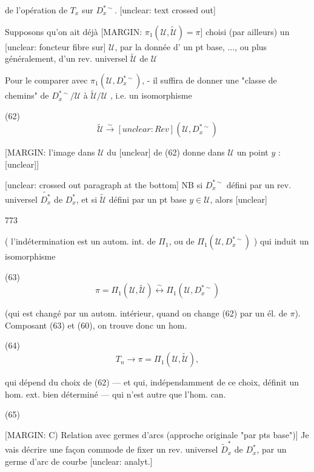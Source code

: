 de l'opération de $T_x$ sur
$D_x^{*\sim}$. [unclear: text crossed out]

Supposons qu'on ait déjà
[MARGIN: $\pi_1(\mathcal{U},\tilde{\mathcal{U}}) = \pi$]
choisi (par ailleurs) un [unclear: foncteur fibre sur] $\mathcal{U}$,
par la donnée d' un pt base, ..., ou plus
généralement, d'un rev. universel $\tilde{\mathcal{U}}$ de $\mathcal{U}$

Pour le comparer avec $\pi_1(\mathcal{U}, D_x^{*\sim})$,
- il suffira de donner une "classe de chemins"
de $D_x^{*\sim} / \mathcal{U}$ à $\tilde{\mathcal{U}} / \mathcal{U}$ , i.e. un
isomorphisme

(62) $$ \tilde{\mathcal{U}} \xrightarrow{\sim} [unclear: Rev](\mathcal{U}, D_x^{*\sim}) $$

[MARGIN: l'image dans $\mathcal{U}$ du [unclear] de (62) donne dans $\mathcal{U}$ un point $y$ : [unclear]]

[unclear: crossed out paragraph at the bottom]
NB si $D_x^{*\sim}$ défini
par un rev. universel $\widetilde{D_x^*}$
de $D_x^*$, et si $\tilde{\mathcal{U}}$
défini par un pt base $y \in \mathcal{U}$,
alors [unclear]

\newpage


773

( l'indétermination est un autom.
int. de $\Pi_1$, ou de $\Pi_1(\mathcal{U}, D_x^{* \sim})$ ) qui
induit un isomorphisme

(63) $$ \pi = \Pi_1(\mathcal{U}, \tilde{\mathcal{U}}) \overset{\sim}{\longleftrightarrow} \Pi_1(\mathcal{U}, D_x^{* \sim}) $$

(qui est changé par un autom. intérieur,
quand on change (62) par un él. de $\pi$).
Composant (63) et (60), on trouve donc
un hom.

(64) $$ T_n \longrightarrow \pi = \Pi_1(\mathcal{U}, \tilde{\mathcal{U}}) , $$

qui dépend du choix de (62) — et
qui, indépendamment de ce choix, définit
un hom. ext. bien déterminé —
qui n'est autre que l'hom. can.

(65) 

[MARGIN: C) Relation avec
germes d'arcs (approche
originale "par pts base")]
Je vais décrire une façon commode
de fixer un rev. universel $\tilde{D}_x^*$ de $D_x^*$,
par un germe d'arc de courbe [unclear: analyt.]


